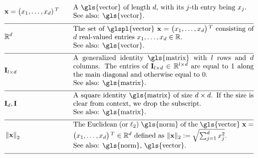 \begin{align} 
	 &\featurevec=\big(\feature_{1}, \ldots, \feature_{\featuredim})\,^{T} &\quad & \parbox{.75\textwidth}{A \gls{vector} of length $\featuredim$, with its 
		$\featureidx$-th entry being $\feature_{\featureidx}$.
		\\ See also: \gls{vector}. } \nonumber \\[2mm] \hline \nonumber\\[-5mm]
	&\mathbb{R}^{\featuredim} & \quad &  \parbox{.75\textwidth}{The set of \glspl{vector} $\featurevec=\big(\feature_{1}, \ldots, \feature_{\featurelen}\big)\,^{T}$ 
		consisting of $\featuredim$ real-valued entries $\feature_{1}, \ldots, \feature_{\featurelen} \in \mathbb{R}$.
		\\ See also: \gls{vector}. } \nonumber \\[2mm] \hline \nonumber\\[-5mm]
	&\mathbf{I}_{\modelidx \times \featuredim}  & \quad &  \parbox{.75\textwidth}{A generalized identity \gls{matrix} 
		with $\modelidx$ rows and $\featuredim$ columns. The entries of $\mathbf{I}_{\modelidx \times \featuredim} \in \mathbb{R}^{\modelidx \times \featuredim}$ 
		are equal to $1$ along the main diagonal and otherwise equal to $0$. 
		\\ See also: \gls{matrix}. }\nonumber \\[2mm] \hline \nonumber\\[-5mm] %
	&\mathbf{I}_{\dimlocalmodel}, \mathbf{I} & \quad &  \parbox{.75\textwidth}{A square identity 
		\gls{matrix} of size $\dimlocalmodel \times \dimlocalmodel$. If the size is clear from context, we drop the subscript.
		\\ See also: \gls{matrix}. } \nonumber \\[2mm] \hline \nonumber\\[-5mm]
	&\normgeneric{\featurevec}{2}  &\quad & \parbox{.75\textwidth}{The Euclidean (or $\ell_{2}$) \gls{norm} of the \gls{vector} 
		$\featurevec=\big(\feature_{1}, \ldots, \feature_{\featurelen}\big)\,^{T} \in \mathbb{R}^{\featuredim}$ defined as 
		$\| \featurevec \|_{2} \defeq \sqrt{\sum_{\featureidx=1}^{\featuredim} \feature_{\featureidx}^{2}}$.
		\\ See also: \gls{norm}, \gls{vector}. } \nonumber \\[2mm] \hline \nonumber\\[-5mm] 

\end{align}
